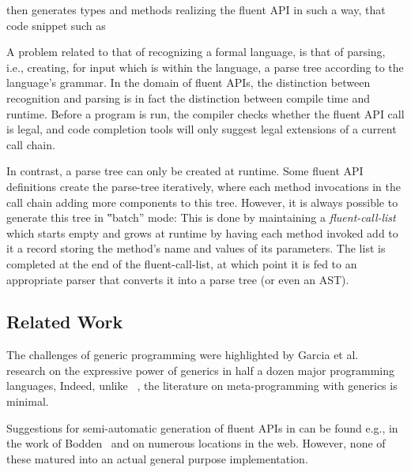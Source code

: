 \begin{quote}
  \parbox[c]{43ex}{}
\end{quote}

\Fajita then generates types and methods realizing the fluent API
 in such a way, that code snippet such as 
\begin{quote}
  \parbox[c]{43ex}{}
\end{quote}

A problem related to that of recognizing a formal language,
is that of parsing, i.e., creating, for input which is within the language,
a parse tree according to the language's grammar.
In the domain of fluent APIs, the distinction between recognition and parsing
is in fact the distinction between compile time and runtime.
Before a program is run, the compiler checks whether the fluent API call is
legal, and code completion tools will only suggest legal extensions of a
current call chain.

In contrast, a parse tree can only be created at runtime.
Some fluent API definitions create the parse-tree
iteratively, where each method invocations in the call chain adding
more components to this tree.
However, it is always possible to generate this tree in ‟batch” mode:
This is done by maintaining a \emph{fluent-call-list} which
starts empty and grows at runtime by having each method invoked add to it
a record storing the method's name and values of its parameters.
The list is completed at the end of the fluent-call-list, at which point it is
fed to an appropriate parser that converts it into a parse tree (or even an
AST).

\subsection{Related Work}
The challenges of \Java generic programming were highlighted by Garcia et
al.~\cite{Garcia:Jarvi:Lumsdaine:Siek:Willcock:03} research on the expressive
power of generics in half a dozen major programming languages, 
Indeed, unlike \CC~\cite{Austern:1998,Musser:Stepanov:1989,
Backhouse:Jansson:1999, Dehnert:Stepanov:2000,Gil:Gutterman:98,Abrahams:Gurtovoy:04}, the literature on meta-programming with \Java
generics is minimal. 

Suggestions for semi-automatic generation of fluent APIs in \Java can be found
e.g., in the work of Bodden~\cite{Bodden:14} and on numerous locations in the
web. However, none of these matured into an actual general purpose
implementation.  

